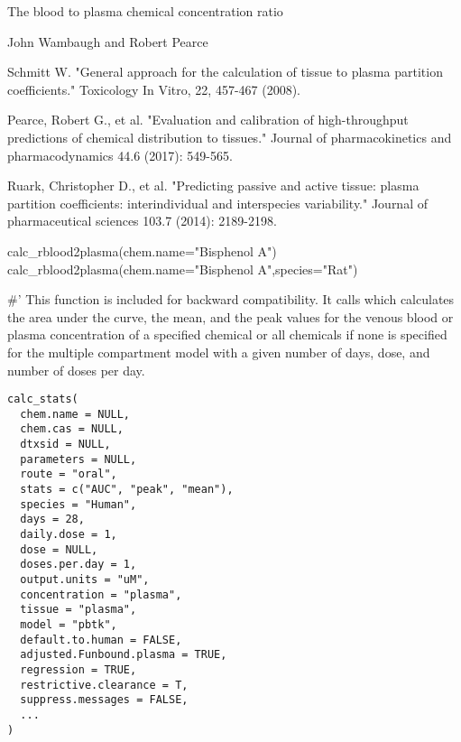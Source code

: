 \documentclass[a4paper]{book}
\begin{document}
%
\begin{Value}
The blood to plasma chemical concentration ratio
\end{Value}
%
\begin{Author}\relax
John Wambaugh and Robert Pearce
\end{Author}
%
\begin{References}\relax
Schmitt W. "General approach for the calculation of tissue to
plasma partition coefficients." Toxicology In Vitro, 22, 457-467 (2008).

Pearce, Robert G., et al. "Evaluation and calibration of high-throughput 
predictions of chemical distribution to tissues." Journal of 
pharmacokinetics and pharmacodynamics 44.6 (2017): 549-565.

Ruark, Christopher D., et al. "Predicting passive and active tissue: plasma 
partition coefficients: interindividual and interspecies variability." 
Journal of pharmaceutical sciences 103.7 (2014): 2189-2198.
\end{References}
%
\begin{Examples}
\begin{ExampleCode}

calc_rblood2plasma(chem.name="Bisphenol A")
calc_rblood2plasma(chem.name="Bisphenol A",species="Rat")

\end{ExampleCode}
\end{Examples}
%
\begin{Description}\relax
\#' This function is included for backward compatibility. It calls
 which 
calculates the area under the curve, the mean, and the peak values
for the venous blood or plasma concentration of a specified chemical or all
chemicals if none is specified for the multiple compartment model with a
given number of days, dose, and number of doses per day.
\end{Description}
%
\begin{Usage}
\begin{verbatim}
calc_stats(
  chem.name = NULL,
  chem.cas = NULL,
  dtxsid = NULL,
  parameters = NULL,
  route = "oral",
  stats = c("AUC", "peak", "mean"),
  species = "Human",
  days = 28,
  daily.dose = 1,
  dose = NULL,
  doses.per.day = 1,
  output.units = "uM",
  concentration = "plasma",
  tissue = "plasma",
  model = "pbtk",
  default.to.human = FALSE,
  adjusted.Funbound.plasma = TRUE,
  regression = TRUE,
  restrictive.clearance = T,
  suppress.messages = FALSE,
  ...
)
\end{verbatim}
\end{Usage}
\end{document}
